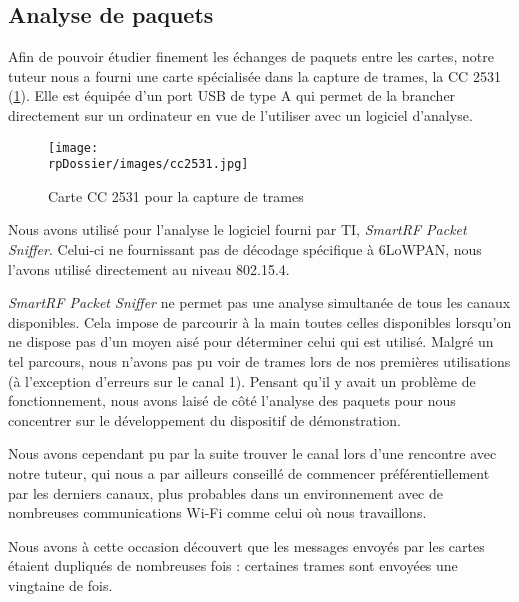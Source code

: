 \subsection{Analyse de paquets}

Afin de pouvoir étudier finement les échanges de paquets entre les cartes, notre tuteur nous a fourni une carte spécialisée dans la capture de trames, la CC 2531 (\cref{cc2531}).
Elle est équipée d’un port USB de type A qui permet de la brancher directement sur un ordinateur en vue de l’utiliser avec un logiciel d’analyse.

\begin{figure}[H]
\centering
\texttt{[image: \\rpDossier/images/cc2531.jpg]}
\caption{Carte CC 2531 pour la capture de trames}
\label{cc2531}
\end{figure}

Nous avons utilisé pour l’analyse le logiciel fourni par TI, \emph{SmartRF Packet Sniffer}.
Celui-ci ne fournissant pas de décodage spécifique à 6LoWPAN, nous l’avons utilisé directement au niveau 802.15.4.

\emph{SmartRF Packet Sniffer} ne permet pas une analyse simultanée de tous les canaux disponibles.
Cela impose de parcourir à la main toutes celles disponibles lorsqu’on ne dispose pas d’un moyen aisé pour déterminer celui qui est utilisé.
Malgré un tel parcours, nous n’avons pas pu voir de trames lors de nos premières utilisations (à l’exception d’erreurs sur le canal 1).
Pensant qu’il y avait un problème de fonctionnement, nous avons laisé de côté l’analyse des paquets pour nous concentrer sur le développement du dispositif de démonstration.

Nous avons cependant pu par la suite trouver le canal lors d’une rencontre avec notre tuteur, qui nous a par ailleurs conseillé de commencer préférentiellement par les derniers canaux, plus probables dans un environnement avec de nombreuses communications Wi-Fi comme celui où nous travaillons.

Nous avons à cette occasion découvert que les messages envoyés par les cartes étaient dupliqués de nombreuses fois : certaines trames sont envoyées une vingtaine de fois.

\todo[explications ?]

